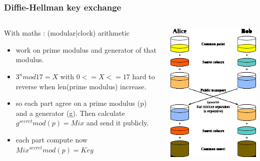 \begin{frame}
\frametitle{Diffie-Hellman key exchange}
\begin{columns}[c]
\begin{block}{With maths : (modular|clock) arithmetic}
\begin{itemize}
\item work on prime modulus and generator of that modulus.
\item $3^n mod 17 = X$ with $0 <= X <= 17$ hard to reverse when len(prime modulus)
increase.
\item so each part agree on a prime modulus (p) and a generator (g).
Then calculate $g^{secret} mod(p)=Mix$ and send it publicly.
\item each part compute now $Mix^{secret} mod(p)=Key$
\end{itemize}
\end{block}
\includegraphics[height=.8\textheight]{./materials/diffie-hellman}
\end{columns}
\end{frame}

